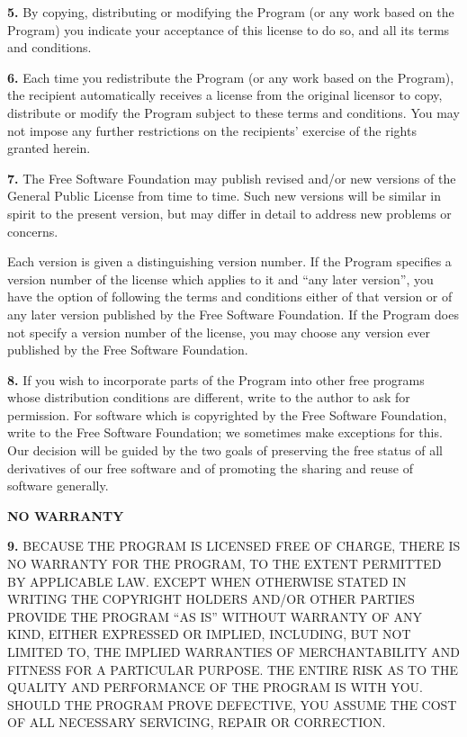 \documentclass[]{article}
\begin{document}
\textbf{5.} By copying, distributing or modifying the Program (or any
work based on the Program) you indicate your acceptance of this license
to do so, and all its terms and conditions.

\textbf{6.} Each time you redistribute the Program (or any work based on
the Program), the recipient automatically receives a license from the
original licensor to copy, distribute or modify the Program subject to
these terms and conditions. You may not impose any further restrictions
on the recipients' exercise of the rights granted herein.

\textbf{7.} The Free Software Foundation may publish revised and/or new
versions of the General Public License from time to time. Such new
versions will be similar in spirit to the present version, but may
differ in detail to address new problems or concerns.

Each version is given a distinguishing version number. If the Program
specifies a version number of the license which applies to it and ``any
later version'', you have the option of following the terms and
conditions either of that version or of any later version published by
the Free Software Foundation. If the Program does not specify a version
number of the license, you may choose any version ever published by the
Free Software Foundation.

\textbf{8.} If you wish to incorporate parts of the Program into other
free programs whose distribution conditions are different, write to the
author to ask for permission. For software which is copyrighted by the
Free Software Foundation, write to the Free Software Foundation; we
sometimes make exceptions for this. Our decision will be guided by the
two goals of preserving the free status of all derivatives of our free
software and of promoting the sharing and reuse of software generally.

\textbf{NO WARRANTY}

\textbf{9.} BECAUSE THE PROGRAM IS LICENSED FREE OF CHARGE, THERE IS NO
WARRANTY FOR THE PROGRAM, TO THE EXTENT PERMITTED BY APPLICABLE LAW.
EXCEPT WHEN OTHERWISE STATED IN WRITING THE COPYRIGHT HOLDERS AND/OR
OTHER PARTIES PROVIDE THE PROGRAM ``AS IS'' WITHOUT WARRANTY OF ANY
KIND, EITHER EXPRESSED OR IMPLIED, INCLUDING, BUT NOT LIMITED TO, THE
IMPLIED WARRANTIES OF MERCHANTABILITY AND FITNESS FOR A PARTICULAR
PURPOSE. THE ENTIRE RISK AS TO THE QUALITY AND PERFORMANCE OF THE
PROGRAM IS WITH YOU. SHOULD THE PROGRAM PROVE DEFECTIVE, YOU ASSUME THE
COST OF ALL NECESSARY SERVICING, REPAIR OR CORRECTION.
\end{document}
